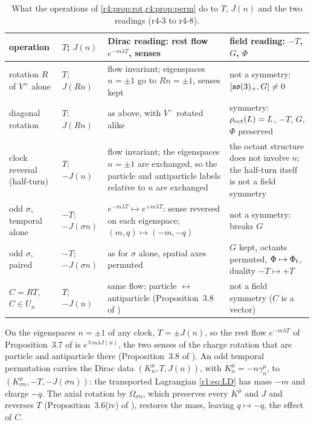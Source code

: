 \begin{table}[t]
\centering
\footnotesize
\setlength{\tabcolsep}{3pt}
\renewcommand{\arraystretch}{1.15}
\begin{tabular}{@{}>{\raggedright\arraybackslash}p{2.6cm}>{\raggedright\arraybackslash}p{1.9cm}>{\raggedright\arraybackslash}p{5.2cm}>{\raggedright\arraybackslash}p{5.0cm}@{}}
\toprule
operation & $T$; $J(n)$ & Dirac reading: rest flow $e^{-m\lambda T}$, senses & field reading: $-T$, $G$, $\Phi$\\
\midrule
rotation $R$ of $V^+$ alone & $T$; $J(Rn)$ & flow invariant; eigenspaces $n=\pm1$ go to $Rn=\pm1$, senses kept & not a symmetry: $[\mathfrak{so}(3)_+,G]\neq0$\\
diagonal rotation & $T$; $J(Rn)$ & as above, with $V^-$ rotated alike & symmetry: $\rho_{\rm oct}(L)=L$, $-T$, $G$, $\Phi$ preserved\\
clock reversal (half-turn) & $T$; $-J(n)$ & flow invariant; the eigenspaces $n=\pm1$ are exchanged, so the particle and antiparticle labels relative to $n$ are exchanged & the octant structure does not involve $n$; the half-turn itself is not a field symmetry\\
odd $\sigma$, temporal alone & $-T$; $-J(\sigma n)$ & $e^{-m\lambda T}\mapsto e^{+m\lambda T}$: sense reversed on each eigenspace; $(m,q)\mapsto(-m,-q)$ & not a symmetry: breaks $G$\\
odd $\sigma$, paired & $-T$; $-J(\sigma n)$ & as for $\sigma$ alone, spatial axes permuted & $G$ kept, octants permuted, $\Phi\mapsto\Phi_{\rm t}$, duality $-T\mapsto+T$\\
$C=RT$, $C\in U_n$ & $T$; $-J(n)$ & same flow; particle $\leftrightarrow$ antiparticle (Proposition~3.8 of \cite{RE}) & not a field symmetry ($C$ is a vector)\\
\bottomrule
\end{tabular}
\caption{What the operations of \cref{r4:prop:rot,r4:prop:perm} do to $T$, $J(n)$ and the two readings (r4-3 to r4-8).}
\label{r4:tab:ops}
\end{table}

\begin{corollary}
\label{r4:cor:senses}
On the eigenspaces $n=\pm1$ of any clock, $T=\pm J(n)$, so the rest flow $e^{-m\lambda T}$ of Proposition~3.7 of \cite{RE} is $e^{\mp m\lambda J(n)}$, the two
senses of the charge rotation that are particle and antiparticle there (Proposition~3.8 of \cite{RE}). An odd temporal permutation carries the
Dirac data $(K^\mu_n,T,J(n))$, with $K^\mu_n=-n\gamma^\mu_n$, to $(K^\mu_{\sigma n},-T,-J(\sigma n))$: the transported Lagrangian \cref{r1:eq:LD} has mass $-m$ and
charge $-q$. The axial rotation by $\Omega_{\sigma n}$, which preserves every $K^\mu$ and $J$ and reverses $T$ (Proposition~3.6(iv) of \cite{RE}), restores the
mass, leaving $q\mapsto-q$, the effect of $C$.
\end{corollary}

